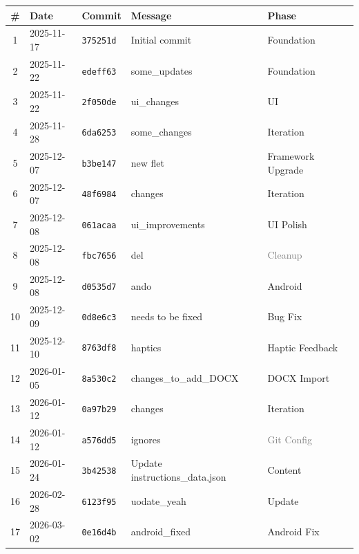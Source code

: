 \documentclass[12pt,a4paper]{article}
\begin{document}
\begin{longtable}{c l l l l}
\toprule
\textbf{\#} & \textbf{Date} & \textbf{Commit} & \textbf{Message} & \textbf{Phase} \\
\midrule
\endhead
1  & 2025-11-17 & \texttt{375251d} & Initial commit               & \textcolor{phase1}{Foundation} \\
2  & 2025-11-22 & \texttt{edeff63} & some\_updates                & \textcolor{phase1}{Foundation} \\
3  & 2025-11-22 & \texttt{2f050de} & ui\_changes                  & \textcolor{phase2}{UI} \\
4  & 2025-11-28 & \texttt{6da6253} & some\_changes                & \textcolor{phase1}{Iteration} \\
5  & 2025-12-07 & \texttt{b3be147} & new flet                     & \textcolor{phase2}{Framework Upgrade} \\
6  & 2025-12-07 & \texttt{48f6984} & changes                      & \textcolor{phase1}{Iteration} \\
7  & 2025-12-08 & \texttt{061acaa} & ui\_improvements             & \textcolor{phase2}{UI Polish} \\
8  & 2025-12-08 & \texttt{fbc7656} & del                          & \textcolor{gray}{Cleanup} \\
9  & 2025-12-08 & \texttt{d0535d7} & ando                         & \textcolor{phase3}{Android} \\
10 & 2025-12-09 & \texttt{0d8e6c3} & needs to be fixed            & \textcolor{phase5}{Bug Fix} \\
11 & 2025-12-10 & \texttt{8763df8} & haptics                      & \textcolor{phase3}{Haptic Feedback} \\
12 & 2026-01-05 & \texttt{8a530c2} & changes\_to\_add\_DOCX       & \textcolor{phase3}{DOCX Import} \\
13 & 2026-01-12 & \texttt{0a97b29} & changes                      & \textcolor{phase1}{Iteration} \\
14 & 2026-01-12 & \texttt{a576dd5} & ignores                      & \textcolor{gray}{Git Config} \\
15 & 2026-01-24 & \texttt{3b42538} & Update instructions\_data.json & \textcolor{phase3}{Content} \\
16 & 2026-02-28 & \texttt{6123f95} & uodate\_yeah                 & \textcolor{phase1}{Update} \\
17 & 2026-03-02 & \texttt{0e16d4b} & android\_fixed               & \textcolor{phase4}{Android Fix} \\

\end{longtable}
\end{document}
